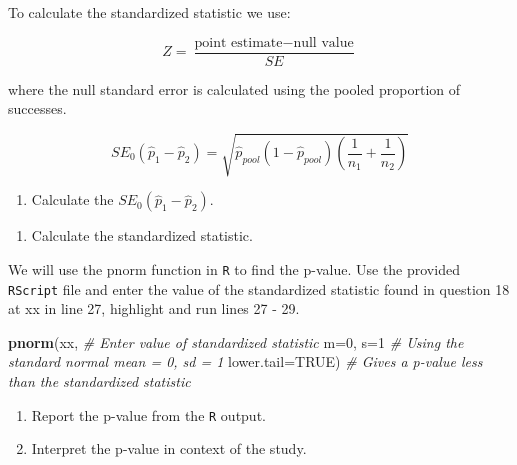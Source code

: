\documentclass[
]{report}
\newenvironment{Shaded}{\begin{snugshade}}{\end{snugshade}}
\newcommand{\CommentTok}[1]{\textcolor[rgb]{0.56,0.35,0.01}{\textit{#1}}}
\newcommand{\DataTypeTok}[1]{\textcolor[rgb]{0.13,0.29,0.53}{#1}}
\newcommand{\DecValTok}[1]{\textcolor[rgb]{0.00,0.00,0.81}{#1}}
\newcommand{\KeywordTok}[1]{\textcolor[rgb]{0.13,0.29,0.53}{\textbf{#1}}}
\newcommand{\NormalTok}[1]{#1}
\newcommand{\OtherTok}[1]{\textcolor[rgb]{0.56,0.35,0.01}{#1}}
\providecommand{\tightlist}{%
  \setlength{\itemsep}{0pt}\setlength{\parskip}{0pt}}
\begin{document}
\vspace{1in}

To calculate the standardized statistic we use:

\[
Z = \frac{\text{point estimate} - \text{null value}}{SE}
\]

where the null standard error is calculated using the pooled proportion of successes.

\[
SE_0(\hat{p}_1-\hat{p}_2)=\sqrt{\hat{p}_{pool}(1-\hat{p}_{pool})(\frac{1}{n_1}+\frac{1}{n_2})}
\]

\vspace{.25in}

\begin{enumerate}
\def\labelenumi{\arabic{enumi}.}
\setcounter{enumi}{16}
\tightlist
\item
  Calculate the \(SE_0(\hat{p}_1-\hat{p}_2)\).
\end{enumerate}

\vspace{1in}

\begin{enumerate}
\def\labelenumi{\arabic{enumi}.}
\setcounter{enumi}{17}
\tightlist
\item
  Calculate the standardized statistic.
\end{enumerate}

\vspace{1in}

We will use the pnorm function in \texttt{R} to find the p-value. Use the provided \texttt{RScript} file and enter the value of the standardized statistic found in question 18 at xx in line 27, highlight and run lines 27 - 29.

\begin{Shaded}
\begin{Highlighting}[]
\KeywordTok{pnorm}\NormalTok{(xx, }\CommentTok{\# Enter value of standardized statistic}
      \DataTypeTok{m=}\DecValTok{0}\NormalTok{, }\DataTypeTok{s=}\DecValTok{1} \CommentTok{\# Using the standard normal mean = 0, sd = 1}
      \DataTypeTok{lower.tail=}\OtherTok{TRUE}\NormalTok{) }\CommentTok{\# Gives a p{-}value less than the standardized statistic}
\end{Highlighting}
\end{Shaded}

\begin{enumerate}
\def\labelenumi{\arabic{enumi}.}
\setcounter{enumi}{18}
\item
  Report the p-value from the \texttt{R} output.
  \vspace{0.2in}
\item
  Interpret the p-value in context of the study.
\end{enumerate}
\end{document}
